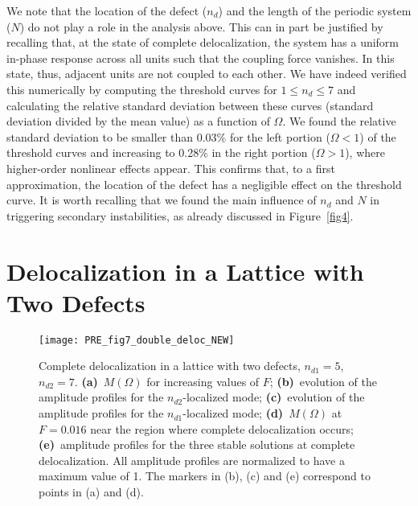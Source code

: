 \documentclass[aps,pre,twocolumn,groupedaddress]{revtex4-1}
\begin{document}
We note that the location of the defect ($n_d$) and the length of the periodic system ($N$) do not play a role in the analysis above. This can in part be justified by recalling that, at the state of complete delocalization, the system has a uniform in-phase response across all units such that the coupling force vanishes. In this state, thus, adjacent units are not coupled to each other. We have indeed verified this numerically by computing the threshold curves for $1 \le n_d \le 7$ and calculating the relative standard deviation between these curves (standard deviation divided by the mean value) as a function of $\Omega$. We found the relative standard deviation to be smaller than 0.03\% for the left portion ($\Omega<1$) of the threshold curves and increasing to 0.28\% in the right portion ($\Omega>1$), where higher-order nonlinear effects appear. This confirms that, to a first approximation, the location of the defect has a negligible effect on the threshold curve. It is worth recalling that we found the main influence of $n_d$ and $N$ in triggering secondary instabilities, as already discussed in Figure~\ref{fig4}.














\section{Delocalization in a Lattice with Two Defects}
\label{sec:double}

\begin{figure*}[bt]
	\texttt{[image: PRE\_fig7\_double\_deloc\_NEW]}%
	\caption{
		\label{fig:double} 
		Complete delocalization in a lattice with two defects, $n_{d1}=5$, $n_{d2}=7$. 
		\textbf{(a)}~$M(\Omega)$ for increasing values of $F$;  
		\textbf{(b)}~evolution of the amplitude profiles for the $n_{d2}$-localized mode;
		\textbf{(c)}~evolution of the amplitude profiles for the $n_{d1}$-localized mode; 
		\textbf{(d)}~$M(\Omega)$ at $F=0.016$ near the region where complete delocalization occurs; 
		\textbf{(e)}~amplitude profiles for the three stable solutions at complete delocalization. 
		All amplitude profiles are normalized to have a maximum value of 1. The markers in (b), (c) and (e) correspond to points in (a) and (d). 
	}
\end{figure*}
\end{document}
